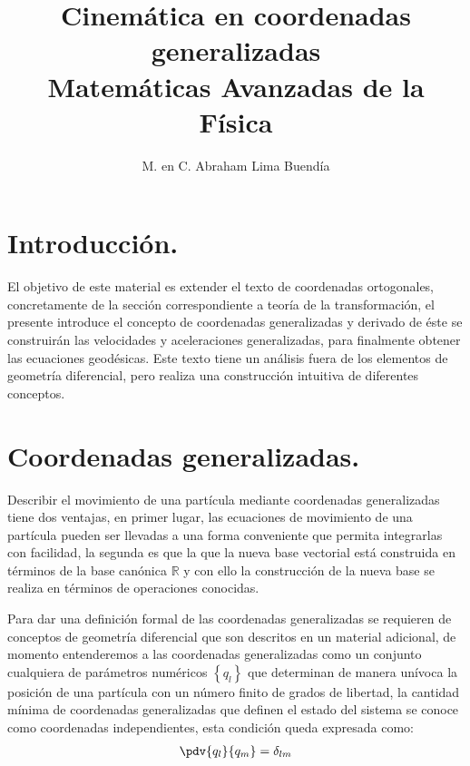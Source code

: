 
\usepackage{apacite}
\title{Cinemática en coordenadas generalizadas \\[0.3em]  \large{Matemáticas Avanzadas de la Física}\vspace{-3ex}}
\author{M. en C. Abraham Lima Buendía}
\date{ }

\vspace{-4cm}
\maketitle
\fontsize{14}{14}\selectfont
\tableofcontents
\newpage


\section{Introducción.}

El objetivo de este material es extender el texto de coordenadas ortogonales, concretamente de la sección correspondiente a teoría de la transformación, el presente introduce el concepto de coordenadas generalizadas y derivado de éste se construirán las velocidades y aceleraciones generalizadas, para finalmente obtener las ecuaciones geodésicas. Este texto tiene un análisis fuera de los elementos de geometría diferencial, pero realiza una construcción intuitiva de diferentes conceptos.

\section{Coordenadas generalizadas.}

Describir el movimiento de una partícula mediante coordenadas generalizadas tiene dos ventajas, en primer lugar, las ecuaciones de movimiento de una partícula pueden ser llevadas a una forma conveniente que permita integrarlas con facilidad, la segunda es que la que la nueva base vectorial está construida en términos de la base canónica $\mathbb{R}$ y con ello la construcción de la nueva base se realiza en términos de operaciones conocidas.
\par
Para dar una definición formal de las coordenadas generalizadas se requieren de conceptos de geometría diferencial que son descritos en un material adicional, de momento entenderemos a las coordenadas generalizadas como un conjunto cualquiera de parámetros numéricos $\left\{ q_{l} \right\}$ que determinan de manera unívoca la posición de una partícula con un número finito de grados de libertad, la cantidad mínima de coordenadas generalizadas que definen el estado del sistema se conoce como coordenadas independientes, esta condición queda expresada como:
\begin{align*}
\pdv{q_{l}}{q_{m}} = \delta_{l m}
\end{align*}

